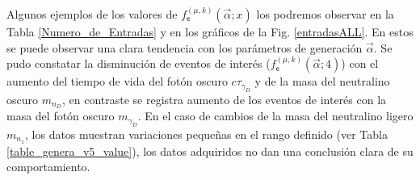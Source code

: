 Algunos ejemplos de los valores de $f^{(\mu, k)}_\textsf{e} (\vec{\alpha}; x)$ los podremos observar en la Tabla \ref{Numero_de_Entradas} y en los gráficos de la Fig. \ref{entradasALL}. En estos se puede observar una clara tendencia con los parámetros de generación $\vec{\alpha}$. Se pudo constatar la disminución de eventos de interés ($f^{(\mu, k)}_\textsf{e} (\vec{\alpha}; 4)$) con el aumento del tiempo de vida del fotón oscuro $c\tau_{\gamma_D}$ y de la masa del neutralino oscuro $m_{n_D}$, en contraste se registra aumento de los eventos de interés con la masa del fotón oscuro $m_{\gamma_D}$. En el caso de cambios de la masa del neutralino ligero $m_{n_1}$, los datos muestran variaciones pequeñas en el rango definido (ver Tabla \ref{table_genera_v5_value}), los datos adquiridos no dan una conclusión clara de su comportamiento.



